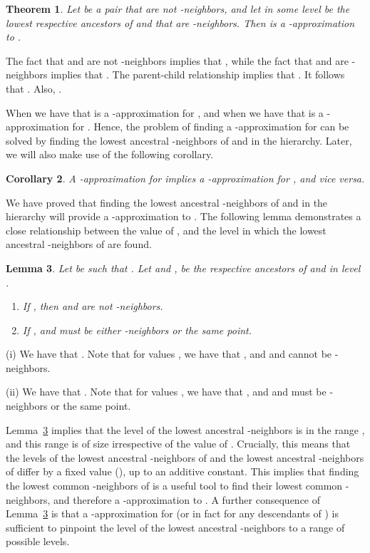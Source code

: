 \documentclass[11pt]{article}
\newtheorem{theorem}{Theorem}
\newtheorem{lemma}[theorem]{Lemma}
\newtheorem{corollary}[theorem]{Corollary}
\newenvironment{proof}{{\bf Proof:\ }}{\hfill\medskip}
\begin{document}
\begin{theorem}\label{thm:approx}
Let  be a pair that are not -neighbors, and let  in some
level  be the lowest respective ancestors of  and  that are -neighbors. Then
 is a -approximation to .
\end{theorem}

\begin{proof}
The fact that  and  are not -neighbors implies that , while the fact
that  and  are -neighbors implies that . The parent-child
relationship implies that
.
It follows that
.
Also,
.
\end{proof}

When  we have that  is a -approximation for 
, and when  we have that  is a -approximation for 
. Hence, the problem of finding a -approximation for  can be 
solved by finding the lowest ancestral -neighbors of  and  in the hierarchy. 
Later, we will also make use of the following corollary.

\begin{corollary}\label{cor:approx}
A -approximation for  implies a -approximation for
, and vice versa.
\end{corollary}

We have proved that finding the lowest ancestral -neighbors of  and  in the
hierarchy will provide a -approximation to . The following lemma demonstrates
a close relationship between the value of , and the level in which 
the lowest ancestral -neighbors  of  are found.

\begin{lemma}\label{lem:level}
Let  be such that  . Let  and , be the
respective ancestors of  and  in level .
\renewcommand{\labelenumi}{(\roman{enumi})}
\begin{enumerate}
\item
If , then  and  are not -neighbors.
\item
If ,  and  must be either -neighbors or the same
point.
\end{enumerate}
\end{lemma}

\begin{proof}
\noindent (i) We have that
.
Note that for values
,
we have that
,
and  and  cannot be -neighbors.

\smallskip
\noindent (ii) We have that
.
Note that for values
,
we have that
,
and  and  must be -neighbors or the same point.
\end{proof}

Lemma~\ref{lem:level} implies that the level of the lowest ancestral
-neighbors  is in the
range ,
and this range is of size  irrespective of the value of .
Crucially, this means that the levels of the lowest ancestral -neighbors
of  and the lowest ancestral -neighbors of  differ by a fixed
value (), up to an additive constant. This implies that
finding the lowest common -neighbors of 
is a useful tool to find their lowest common -neighbors, and therefore
a -approximation to . A further consequence of
Lemma~\ref{lem:level} is that a -approximation for  (or in
fact for any descendants of ) is
sufficient to pinpoint the level of the lowest ancestral -neighbors
 to a range of  possible levels.
\end{document}

